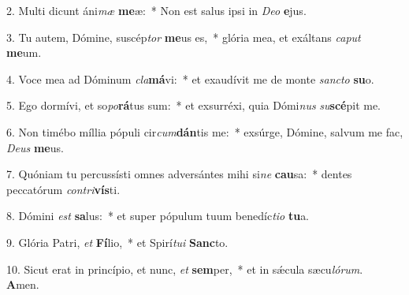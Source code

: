 2. Multi dicunt áni\textit{mæ} \textbf{me}æ:~*  Non est salus ipsi in \textit{De}\textit{o} \textbf{e}jus.\

3. Tu autem, Dómine, suscép\textit{tor} \textbf{me}us es,~*  glória mea, et exáltans \textit{ca}\textit{put} \textbf{me}um.\

4. Voce mea ad Dóminum \textit{cla}\textbf{má}vi:~*  et exaudívit me de monte \textit{sanc}\textit{to} \textbf{su}o.\

5. Ego dormívi, et so\textit{po}\textbf{rá}tus sum:~*  et exsurréxi, quia Dómi\textit{nus} \textit{su}\textbf{scé}pit me.\

6. Non timébo míllia pópuli cir\textit{cum}\textbf{dán}tis me:~*  exsúrge, Dómine, salvum me fac, \textit{De}\textit{us} \textbf{me}us.\

7. Quóniam tu percussísti omnes adversántes mihi si\textit{ne} \textbf{cau}sa:~*  dentes peccatórum \textit{con}\textit{tri}\textbf{vís}ti.\

8. Dómini \textit{est} \textbf{sa}lus:~*  et super pópulum tuum benedíc\textit{ti}\textit{o} \textbf{tu}a.\

9. Glória Patri, \textit{et} \textbf{Fí}lio,~*  et Spirí\textit{tu}\textit{i} \textbf{Sanc}to.\

10. Sicut erat in princípio, et nunc, \textit{et} \textbf{sem}per,~*  et in sǽcula sæcu\textit{ló}\textit{rum}. \textbf{A}men.\

